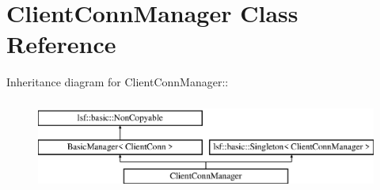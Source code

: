 \hypertarget{classClientConnManager}{
\section{ClientConnManager Class Reference}
\label{classClientConnManager}
}
Inheritance diagram for ClientConnManager::\begin{figure}[H]
\begin{center}
\leavevmode
\includegraphics[height=3cm]{classClientConnManager}
\end{center}
\end{figure}
